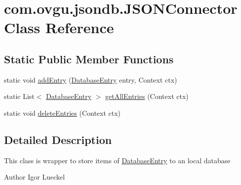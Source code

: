 \hypertarget{classcom_1_1ovgu_1_1jsondb_1_1_j_s_o_n_connector}{\section{com.\-ovgu.\-jsondb.\-J\-S\-O\-N\-Connector Class Reference}
\label{classcom_1_1ovgu_1_1jsondb_1_1_j_s_o_n_connector}
}
\subsection*{Static Public Member Functions}
\begin{DoxyCompactItemize}
\item 
static void \hyperlink{classcom_1_1ovgu_1_1jsondb_1_1_j_s_o_n_connector_a112f195b08f25e352c3148c9c930e920}{add\-Entry} (\hyperlink{classcom_1_1ovgu_1_1util_1_1_database_entry}{Database\-Entry} entry, Context ctx)
\item 
static List$<$ \hyperlink{classcom_1_1ovgu_1_1util_1_1_database_entry}{Database\-Entry} $>$ \hyperlink{classcom_1_1ovgu_1_1jsondb_1_1_j_s_o_n_connector_af5b2897760749ce7d5e7ee5a7e7617f7}{get\-All\-Entries} (Context ctx)
\item 
static void \hyperlink{classcom_1_1ovgu_1_1jsondb_1_1_j_s_o_n_connector_abd4d4fba31c513848a85b22bce65fdeb}{delete\-Entries} (Context ctx)
\end{DoxyCompactItemize}


\subsection{Detailed Description}
This class is wrapper to store items of \hyperlink{}{Database\-Entry} to an local database \begin{DoxyAuthor}{Author}
Igor Lueckel 
\end{DoxyAuthor}


